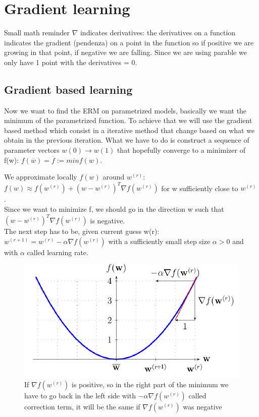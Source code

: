 \chapter{Gradient learning}

Small math reminder $\nabla$ indicates derivatives: the derivatives on a function indicates the gradient (pendenza) on a point in the function so if positive we are growing in that point, if negative we are falling. Since we are using parable we only have 1 point with the derivatives = 0. 
\section{Gradient based learning}
Now we want to find the ERM on parametrized models, basically we want the minimum of the parametrized function. To achieve that we will use the gradient based method which consist in a iterative method that change based on what we obtain in the previous iteration.
What we have to do is construct a sequence of parameter vectors $w(0) \rightarrow w(1)$ that hopefully converge to a minimizer of f(w): $ f(\overline{w}) = \overline{f} := min f(w) $.

We approximate  locally $f(w)$ around $w^{(r)}$: $ f(w)\approx f(w^{(r)}) + (w-w^{(r)})^T \nabla f (w^{(r)})$ for w sufficiently close to $ w^{(r)}$.\\
Since we want to minimize f, we should go in the direction w such that $(w-w^{(r)})^T \nabla f (w^{(r)})$ is negative.\\
The next step has to be, given current guess w(r): $w^{(r +1)} = w^{(r)} - \alpha \nabla f(w^{(r)}) $ with a sufficiently small step size $\alpha >0$ and with $\alpha$ called learning rate.
\begin{figure}[H]
    \centering
    \includegraphics[scale=0.7]{images/GB/GB1.png}
    \caption{If $\nabla f(w^{(r)}) $ is positive, so in the right part of the minimum we have to go back in the left side with $- \alpha \nabla f(w^{(r)})$ called correction term, it will be the same if $\nabla f(w^{(r)}) $ was negative}
    \label{fig:enter-label}
\end{figure}

